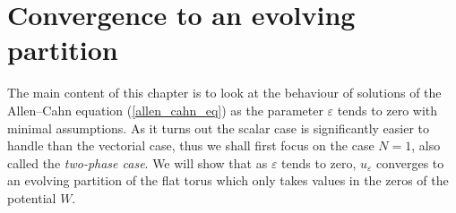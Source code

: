 \chapter{Convergence to an evolving partition}

The main content of this chapter is to look at the behaviour of solutions of 
the Allen--Cahn equation (\ref{allen_cahn_eq}) as the parameter $ \varepsilon $ 
tends to zero with minimal assumptions. As it turns out the scalar case is 
significantly easier to handle than the vectorial case, thus we shall first 
focus on the case $ N = 1 $,
also called the \emph{two-phase case}. We will show that as $ \varepsilon $ 
tends to zero, $ u_{ \varepsilon } $ converges to an evolving partition of the 
flat torus which only takes values in the zeros of the potential $ W $. 






